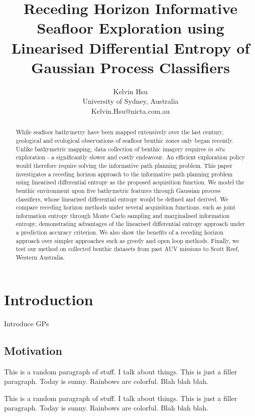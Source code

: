 \documentclass{article}
\title{Receding Horizon Informative Seafloor Exploration using Linearised Differential Entropy of Gaussian Process Classifiers}
\author{Kelvin Hsu \\ University of Sydney, Australia \\ 
Kelvin.Hsu@nicta.com.au}
\begin{document}
\maketitle

\begin{abstract}
	While seafloor bathymetry have been mapped extensively over the last century, geological and ecological observations of seafloor benthic zones only began recently. Unlike bathymetric mapping, data collection of benthic imagery requires \textit{in situ} exploration - a significantly slower and costly endeavour. An efficient exploration policy would therefore require solving the informative path planning problem. This paper investigates a receding horizon approach to the informative path planning problem using linearised differential entropy as the proposed acquisition function. We model the benthic environment upon five bathymetric features through Gaussian process classifiers, whose linearised differential entropy would be defined and derived. We compare receding horizon methods under several acquisition functions, such as joint information entropy through Monte Carlo sampling and marginalised information entropy, demonstrating advantages of the linearised differential entropy approach under a prediction accuracy criterion. We also show the benefits of a receding horizon approach over simpler approaches such as greedy and open loop methods. Finally, we test our method on collected benthic datasets from past AUV missions to Scott Reef, Western Australia.
	
\end{abstract}

\section{Introduction}
\label{Section:Introduction}
	
	Introduce GPs \cite{GaussianProcessForMachineLearning}
	
	\subsection{Motivation}
		
		{\color{BurntOrange} This is a random paragraph of stuff. I talk about things. This is just a filler paragraph. Today is sunny. Rainbows are colorful. Blah blah blah.}
		
		{\color{BurntOrange} This is a random paragraph of stuff. I talk about things. This is just a filler paragraph. Today is sunny. Rainbows are colorful. Blah blah blah.}
		
\end{document}
